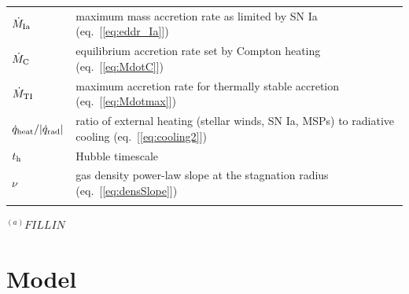 \documentclass[usenatbib,fleqn]{mn2e}
\begin{document}
\begin{table}
\begin{threeparttable}
\begin{minipage}{18cm}
\begin{tabular}{ll}
$\dot{M}_{\rm Ia}$ & maximum mass accretion rate as limited by SN Ia (eq.~[\ref{eq:eddr_Ia}]) \\
$\dot{M}_{\rm C}$ & equilibrium accretion rate set by Compton heating (eq.~[\ref{eq:MdotC}]) \\
$\dot{M}_{\rm TI}$ & maximum accretion rate for thermally stable accretion (eq.~[\ref{eq:Mdotmax}]) \\
$\dot{q}_{\rm heat}/|\dot{q}_{\rm rad}|$ & ratio of external heating (stellar winds, SN Ia, MSPs) to radiative cooling (eq.~[\ref{eq:cooling2}]) \\
$t_{\rm h}$ & Hubble timescale \\
$\nu$ & gas density power-law slope at the stagnation radius
(eq.~[\ref{eq:densSlope}]) \\
\hline
\label{table:definitions}  
\end{tabular}
\begin{tablenotes}
\item{$^{(a)}FILL IN$}
\end{tablenotes}
\end{minipage}
\end{threeparttable}

\end{table}


\section{Model}
\label{sec:model}
\end{document}
